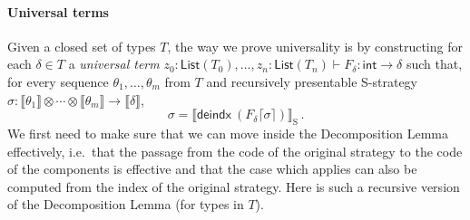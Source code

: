 \documentclass{CSML}
\theoremstyle{definition}\newtheorem{definition}[thm]{Definition}
\theoremstyle{definition}\newtheorem{example}[thm]{Example}
\theoremstyle{definition}\newtheorem{proposition}[thm]{Proposition}
\theoremstyle{definition}\newtheorem{lemma}[thm]{Lemma}
\theoremstyle{definition}\newtheorem{theorem}[thm]{Theorem}
\theoremstyle{definition}\newtheorem{corollary}[thm]{Corollary}
\theoremstyle{definition}\newtheorem{remark}[thm]{Remark}
\newcommand\arr{\rightarrow}
\renewcommand\int{\mathsf{int}}
\newcommand\List[1]{\mathsf{List}(#1)}
\newcommand\deindx[1]{\mathsf{deindx}\ #1}
\newcommand\code[1]{\lceil#1\rceil}
\newcommand\sem[1]{\llbracket #1 \rrbracket}
\newcommand\ssem[1]{\sem{#1}_{\mathrm{S}}}
\begin{document}
\paragraph{\bf Universal terms}
Given a closed set of types $T$, the way we prove universality is by constructing for each $\delta\in T$ a \emph{universal term} $z_0:\List{T_0},\dots,z_n:\List{T_n}\vdash F_\delta:\int\arr\delta$ such that,
for every sequence $\theta_1,\dots,\theta_m$ from $T$ and recursively presentable S-strategy $\sigma:\sem{\theta_1}\otimes\cdots\otimes\sem{\theta_m}\arr\sem{\delta}$,
\[ \sigma = \ssem{\deindx (F_\delta\code{\sigma})}\,. \]
We first need to make sure that we can move inside the Decomposition Lemma effectively, i.e.\ that the passage from the code of the original strategy to the code of the components is effective and that the case which applies can also be computed from the index of the original strategy. Here is such a recursive version of the Decomposition Lemma (for types in $T$).\newpage
\end{document}
